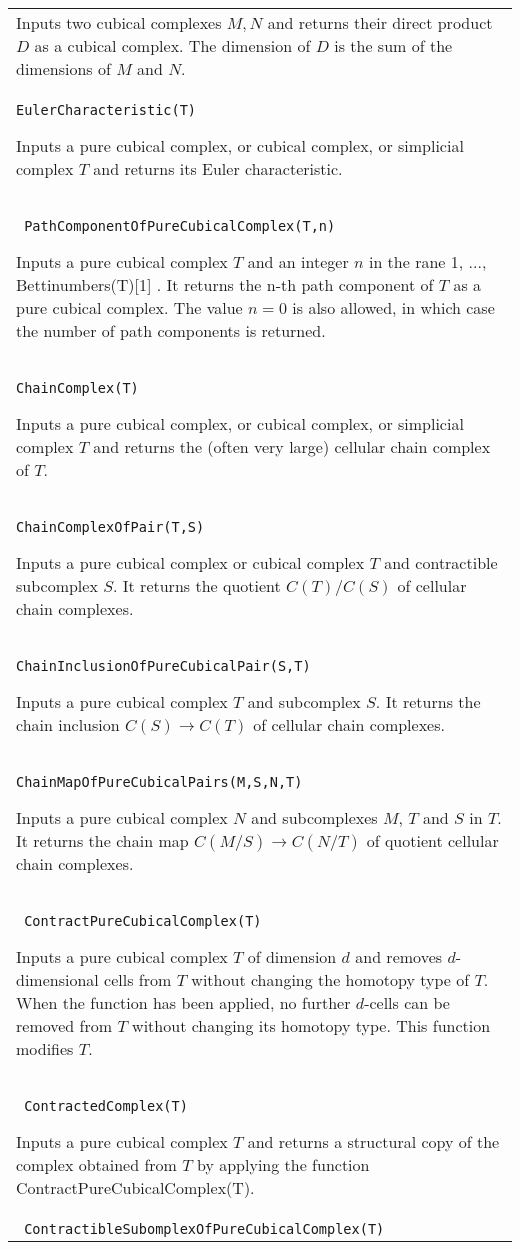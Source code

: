 \documentclass[a4paper,11pt]{report}
\begin{document}
{\begin{center}
\begin{tabular}{|l|}
 Inputs two cubical complexes $M,N$ and returns their direct product $D$ as a cubical complex. The dimension of $D$ is the sum of the dimensions of $M$ and $N$. \\
 \texttt{EulerCharacteristic(T)} 

 Inputs a pure cubical complex, or cubical complex, or simplicial complex $T$ and returns its Euler characteristic. \\
 \index{PathComponentOfPureCubicalComplex} \texttt{ PathComponentOfPureCubicalComplex(T,n)} 

 Inputs a pure cubical complex $T$ and an integer $n$ in the rane 1, ..., Bettinumbers(T)[1] . It returns the n-th path component of $T$ as a pure cubical complex. The value $n=0$ is also allowed, in which case the number of path components is returned. \\
 \texttt{ChainComplex(T)} 

 Inputs a pure cubical complex, or cubical complex, or simplicial complex $T$ and returns the (often very large) cellular chain complex of $T$. \\
 \texttt{ChainComplexOfPair(T,S)} 

 Inputs a pure cubical complex or cubical complex $T$ and contractible subcomplex $S$. It returns the quotient $C(T)/C(S)$ of cellular chain complexes. \\
 \index{ChainInclusionOfPureCubicalPair} \texttt{ChainInclusionOfPureCubicalPair(S,T)} 

 Inputs a pure cubical complex $T$ and subcomplex $S$. It returns the chain inclusion $C(S) \rightarrow C(T)$ of cellular chain complexes. \\
 \index{ChainMapOfPureCubicalPairs} \texttt{ChainMapOfPureCubicalPairs(M,S,N,T)} 

 Inputs a pure cubical complex $N$ and subcomplexes $M$, $T$ and $S$ in $T$. It returns the chain map $C(M/S) \rightarrow C(N/T)$ of quotient cellular chain complexes. \\
 \index{ContractPureCubicalComplex} \texttt{ ContractPureCubicalComplex(T)} 

 Inputs a pure cubical complex $T$ of dimension $d$ and removes $d$-dimensional cells from $T$ without changing the homotopy type of $T$. When the function has been applied, no further $d$-cells can be removed from $T$ without changing its homotopy type. This function modifies $T$. \\
 \index{ContractedComplex} \texttt{ ContractedComplex(T)} 

 Inputs a pure cubical complex $T$ and returns a structural copy of the complex obtained from $T$ by applying the function ContractPureCubicalComplex(T). \\
 \index{ContractibleSubomplexOfPureCubicalComplex} \texttt{ ContractibleSubomplexOfPureCubicalComplex(T)} 


\end{tabular}
\end{center}}
\end{document}
